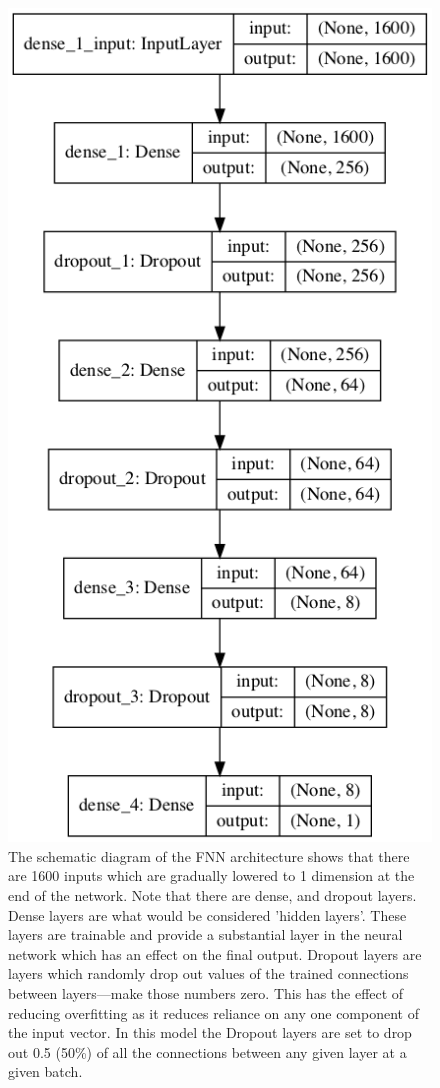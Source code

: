 \documentclass[a4paper,fleqn,usenatbib]{mnras}
\begin{document}
\begin{figure}
\includegraphics[width=\columnwidth]{../Figures/FNN_model_self}
\caption{The schematic diagram of the FNN architecture shows that there are 1600 inputs which are gradually lowered to 1 dimension at the end of the network. Note that there are dense, and dropout layers. Dense layers are what would be considered 'hidden layers'. These layers are trainable and provide a substantial layer in the neural network which has an effect on the final output. Dropout layers are layers which randomly drop out values of the trained connections between layers---make those numbers zero. This has the effect of reducing overfitting as it reduces reliance on any one component of the input vector. In this model the Dropout layers are set to drop out 0.5 (50\%) of all the connections between any given layer at a given batch. \label{figure:FNNModel}}	
\end{figure}
\end{document}

